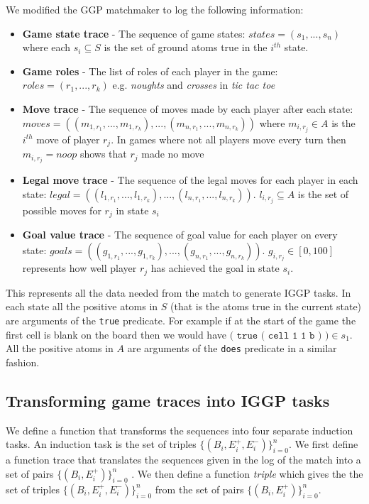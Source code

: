 We modified the GGP matchmaker to log the following information:
\begin{itemize}
	\item \textbf{Game state trace} - The sequence of game states: $states = (s_1,...,s_n)$ where each $s_i \subseteq S$ is the set of ground atoms true in the $i^{th}$ state.
	\item \textbf{Game roles} - The list of roles of each player in the game: $roles = (r_1,...,r_k)$ e.g. \textit{noughts} and \textit{crosses} in \textit{tic tac toe}
	\item \textbf{Move trace} - The sequence of moves made by each player after each state: $moves = ((m_{1,r_1},...,m_{1,r_k}),...,(m_{n,r_1},...,m_{n,r_k}))$ where $m_{i,r_j} \in A$ is the $i^{th}$ move of player $r_j$. In games where not all players move every turn then $m_{i,r_j}=noop$ shows that $r_j$ made no move
	\item \textbf{Legal move trace} - The sequence of the legal moves for each player in each state:  $legal = ((l_{1,r_1},...,l_{1,r_k}),...,(l_{n,r_1},...,l_{n,r_k}))$. $l_{i,r_j} \subseteq A$ is the set of possible moves for $r_j$ in state $s_i$
	\item \textbf{Goal value trace} - The sequence of goal value for each player on every state: $goals = ((g_{1,r_1},...,g_{1,r_k}),...,(g_{n,r_1},...,g_{n,r_k}))$. $g_{i,r_j} \in [0,100]$ represents how well player $r_j$ has achieved the goal in state $s_i$.

\end{itemize}
This represents all the data needed from the match to generate IGGP tasks. In each state all the positive atoms in $S$ (that is the atoms true in the current state) are arguments of the \texttt{true} predicate. For example if at the start of the game the first cell is blank on the board then we would have $\texttt{( true ( cell 1 1 b ) )} \in s_1$. All the positive atoms in $A$ are arguments of the \texttt{does} predicate in a similar fashion.

\subsection{Transforming game traces into IGGP tasks}

We define a function that transforms the sequences into four separate induction tasks. An induction task is the set of triples $\{(B_i,E_i^+,E_i^-)\}_{i=0}^n$. We first define a function trace that translates the sequences given in the log of the match into a set of pairs $\{(B_i,E_i^+)\}_{i=0}^n$ . We then define a function \textit{triple} which gives the the set of triples  $\{(B_i,E_i^+,E_i^-)\}_{i=0}^n$ from the set of pairs $\{(B_i,E_i^+)\}_{i=0}^n$.
\\


